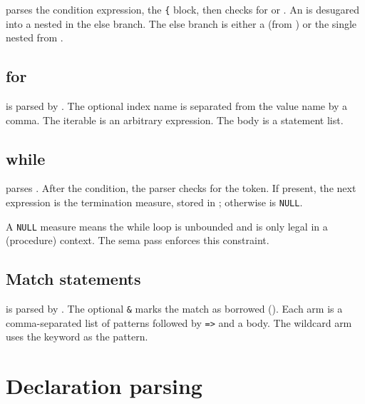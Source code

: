 \pnum
{} parses the condition expression, the \texttt{\{} block,
then checks for  or .  An  is desugared into a
nested  in the else branch.  The else branch is either a
 (from ) or the single nested
 from .

\subsection{for}
\label{sec:par-stmt-for}

\pnum
{} is parsed by .
The optional index name is separated from the value name by a comma.
The iterable is an arbitrary expression.  The body is a statement list.

\subsection{while}
\label{sec:par-stmt-while}

\pnum
{} parses .
After the condition, the parser checks for the 
token.  If present, the next expression is the termination measure, stored in
; otherwise  is \texttt{NULL}.

\pnum
A \texttt{NULL} measure means the while loop is unbounded and is only legal in a
 (procedure) context.  The sema pass enforces this constraint.

\subsection{Match statements}
\label{sec:par-stmt-match}

\pnum
{} is parsed by .
The optional \texttt{\&} marks the match as borrowed ().
Each arm is a comma-separated list of patterns followed by \texttt{=>} and a body.
The wildcard arm uses the  keyword as the pattern.

\section{Declaration parsing}
\label{sec:par-decls}

